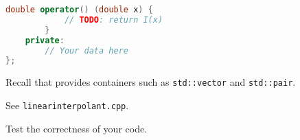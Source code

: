 \begin{problem}
\begin{subproblem}[3]
\begin{lstlisting}[language=c++]
        double operator() (double x) {
            // TODO: return I(x)
        }
    private:
        // Your data here
};
  \end{lstlisting}
  
  \begin{hint}
   Recall that \Cpp{} provides containers such as \verb|std::vector| and \verb|std::pair|.
  \end{hint}

\cprotEnv \begin{solution}
   See \verb|linearinterpolant.cpp|.
  \end{solution}
\end{subproblem}

 \begin{subproblem}[1]
  Test the correctness of your code.
 \end{subproblem}
 
\end{problem}
